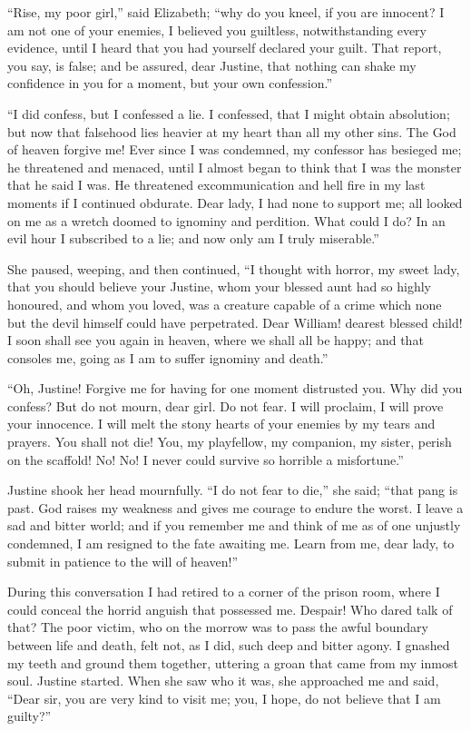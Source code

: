 \documentclass[12pt,openright]{book}
\begin{document}
“Rise, my poor girl,” said Elizabeth; “why do you kneel, if you are innocent? I am not one of your enemies, I believed you guiltless, notwithstanding every evidence, until I heard that you had yourself declared your guilt. That report, you say, is false; and be assured, dear Justine, that nothing can shake my confidence in you for a moment, but your own confession.”

“I did confess, but I confessed a lie. I confessed, that I might obtain absolution; but now that falsehood lies heavier at my heart than all my other sins. The God of heaven forgive me! Ever since I was condemned, my confessor has besieged me; he threatened and menaced, until I almost began to think that I was the monster that he said I was. He threatened excommunication and hell fire in my last moments if I continued obdurate. Dear lady, I had none to support me; all looked on me as a wretch doomed to ignominy and perdition. What could I do? In an evil hour I subscribed to a lie; and now only am I truly miserable.”

She paused, weeping, and then continued, “I thought with horror, my sweet lady, that you should believe your Justine, whom your blessed aunt had so highly honoured, and whom you loved, was a creature capable of a crime which none but the devil himself could have perpetrated. Dear William! dearest blessed child! I soon shall see you again in heaven, where we shall all be happy; and that consoles me, going as I am to suffer ignominy and death.”

“Oh, Justine! Forgive me for having for one moment distrusted you. Why did you confess? But do not mourn, dear girl. Do not fear. I will proclaim, I will prove your innocence. I will melt the stony hearts of your enemies by my tears and prayers. You shall not die! You, my playfellow, my companion, my sister, perish on the scaffold! No! No! I never could survive so horrible a misfortune.”

Justine shook her head mournfully. “I do not fear to die,” she said; “that pang is past. God raises my weakness and gives me courage to endure the worst. I leave a sad and bitter world; and if you remember me and think of me as of one unjustly condemned, I am resigned to the fate awaiting me. Learn from me, dear lady, to submit in patience to the will of heaven!”

During this conversation I had retired to a corner of the prison room, where I could conceal the horrid anguish that possessed me. Despair! Who dared talk of that? The poor victim, who on the morrow was to pass the awful boundary between life and death, felt not, as I did, such deep and bitter agony. I gnashed my teeth and ground them together, uttering a groan that came from my inmost soul. Justine started. When she saw who it was, she approached me and said, “Dear sir, you are very kind to visit me; you, I hope, do not believe that I am guilty?”
\end{document}
